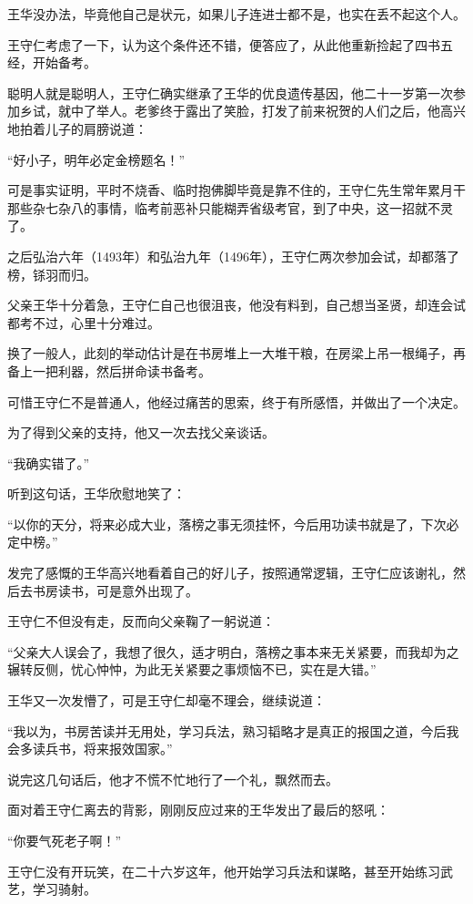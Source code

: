 \begin{multicols}{\theparacolNo}
		王华没办法，毕竟他自己是状元，如果儿子连进士都不是，也实在丢不起这个人。

		王守仁考虑了一下，认为这个条件还不错，便答应了，从此他重新捡起了四书五经，开始备考。

		聪明人就是聪明人，王守仁确实继承了王华的优良遗传基因，他二十一岁第一次参加乡试，就中了举人。老爹终于露出了笑脸，打发了前来祝贺的人们之后，他高兴地拍着儿子的肩膀说道：

		“好小子，明年必定金榜题名！”

		可是事实证明，平时不烧香、临时抱佛脚毕竟是靠不住的，王守仁先生常年累月干那些杂七杂八的事情，临考前恶补只能糊弄省级考官，到了中央，这一招就不灵了。

		之后弘治六年（1493年）和弘治九年（1496年），王守仁两次参加会试，却都落了榜，铩羽而归。

		父亲王华十分着急，王守仁自己也很沮丧，他没有料到，自己想当圣贤，却连会试都考不过，心里十分难过。

		换了一般人，此刻的举动估计是在书房堆上一大堆干粮，在房梁上吊一根绳子，再备上一把利器，然后拼命读书备考。

		可惜王守仁不是普通人，他经过痛苦的思索，终于有所感悟，并做出了一个决定。

		为了得到父亲的支持，他又一次去找父亲谈话。

		“我确实错了。”

		听到这句话，王华欣慰地笑了：

		“以你的天分，将来必成大业，落榜之事无须挂怀，今后用功读书就是了，下次必定中榜。”

		发完了感慨的王华高兴地看着自己的好儿子，按照通常逻辑，王守仁应该谢礼，然后去书房读书，可是意外出现了。

		王守仁不但没有走，反而向父亲鞠了一躬说道：

		“父亲大人误会了，我想了很久，适才明白，落榜之事本来无关紧要，而我却为之辗转反侧，忧心忡忡，为此无关紧要之事烦恼不已，实在是大错。”

		王华又一次发懵了，可是王守仁却毫不理会，继续说道：

		“我以为，书房苦读并无用处，学习兵法，熟习韬略才是真正的报国之道，今后我会多读兵书，将来报效国家。”

		说完这几句话后，他才不慌不忙地行了一个礼，飘然而去。

		面对着王守仁离去的背影，刚刚反应过来的王华发出了最后的怒吼：

		“你要气死老子啊！”

		王守仁没有开玩笑，在二十六岁这年，他开始学习兵法和谋略，甚至开始练习武艺，学习骑射。


\end{multicols}
